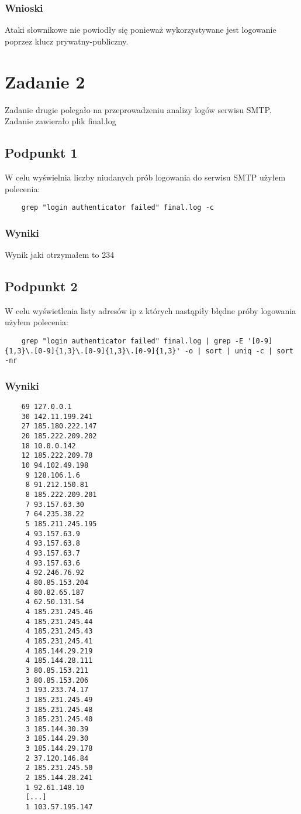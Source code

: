 \documentclass{article}
\begin{document}
\subsubsection{Wnioski}

Ataki słownikowe nie powiodły się ponieważ wykorzystywane jest logowanie poprzez klucz prywatny-publiczny.
\section{Zadanie 2}
Zadanie drugie polegało na przeprowadzeniu analizy logów serwisu SMTP. Zadanie zawierało plik final.log
\subsection{Podpunkt 1}
W celu wyświelnia liczby niudanych prób logowania do serwisu SMTP użyłem polecenia:
\begin{verbatim}
    grep "login authenticator failed" final.log -c
\end{verbatim}
\subsubsection{Wyniki}
Wynik jaki otrzymałem to  234
\subsection{Podpunkt 2}
W celu wyświetlenia listy adresów ip z których nastąpiły błędne próby logowania użyłem polecenia:
\begin{verbatim}
    grep "login authenticator failed" final.log | grep -E '[0-9]{1,3}\.[0-9]{1,3}\.[0-9]{1,3}\.[0-9]{1,3}' -o | sort | uniq -c | sort -nr
\end{verbatim}
\subsubsection{Wyniki}
\begin{verbatim}
    69 127.0.0.1
    30 142.11.199.241
    27 185.180.222.147
    20 185.222.209.202
    18 10.0.0.142
    12 185.222.209.78
    10 94.102.49.198
     9 128.106.1.6
     8 91.212.150.81
     8 185.222.209.201
     7 93.157.63.30
     7 64.235.38.22
     5 185.211.245.195
     4 93.157.63.9
     4 93.157.63.8
     4 93.157.63.7
     4 93.157.63.6
     4 92.246.76.92
     4 80.85.153.204
     4 80.82.65.187
     4 62.50.131.54
     4 185.231.245.46
     4 185.231.245.44
     4 185.231.245.43
     4 185.231.245.41
     4 185.144.29.219
     4 185.144.28.111
     3 80.85.153.211
     3 80.85.153.206
     3 193.233.74.17
     3 185.231.245.49
     3 185.231.245.48
     3 185.231.245.40
     3 185.144.30.39
     3 185.144.29.30
     3 185.144.29.178
     2 37.120.146.84
     2 185.231.245.50
     2 185.144.28.241
     1 92.61.148.10
     [...]
     1 103.57.195.147
\end{verbatim}
\end{document}

